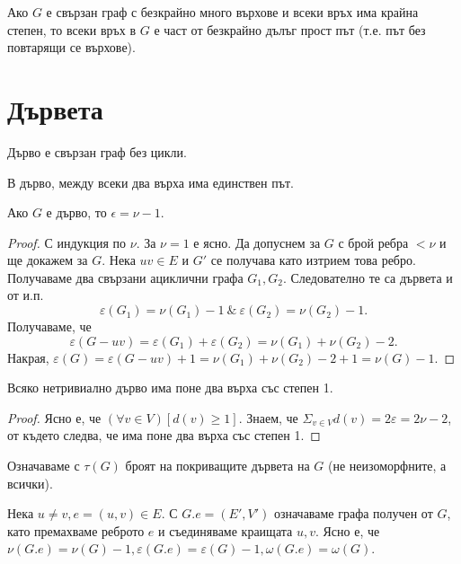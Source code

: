 \begin{lemma}
  Ако $G$ е свързан граф с безкрайно много върхове и всеки връх има крайна степен, то всеки връх в $G$ е част от 
  безкрайно дълъг прост път (т.е. път без повтарящи се върхове).
\end{lemma}


\section{Дървета}
\label{sect:tree}

\begin{dfn}
  Дърво е свързан граф без цикли.
\end{dfn}

\begin{thm}
  В дърво, между всеки два върха има единствен път.
\end{thm}

\begin{thm}
  Ако $G$ е дърво, то $\epsilon = \nu - 1$.
\end{thm}
\begin{proof}
  С индукция по $\nu$. За $\nu = 1$ е ясно.
  Да допуснем за $G$ с брой ребра $<\nu$ и ще докажем за $G$.
  Нека $uv\in E$ и $G'$ се получава като изтрием това ребро.
  Получаваме два свързани ациклични графа $G_1, G_2$.
  Следователно те са дървета и от и.п. 
  \[\varepsilon(G_1) = \nu(G_1) - 1\ \&\ \varepsilon(G_2) = \nu(G_2) - 1.\]
  Получаваме, че 
  \[\varepsilon(G - uv) = \varepsilon(G_1) + \varepsilon(G_2) = \nu(G_1) + \nu(G_2) - 2.\]
  Накрая, $\varepsilon(G) = \varepsilon(G-uv) + 1 = \nu(G_1) + \nu(G_2) - 2 + 1= \nu(G) - 1$.
\end{proof}

\begin{corollary}
  Всяко нетривиално дърво има поне два върха със степен 1.
\end{corollary}
\begin{proof}
  Ясно е, че $(\forall v\in V)[d(v) \geq 1]$.
  Знаем, че $\Sigma_{v\in V}d(v) = 2\varepsilon = 2\nu - 2$, от където следва, че има поне два върха със степен 1.
\end{proof}



Означаваме с $\tau(G)$ броят на покриващите дървета на $G$ (не неизоморфните, а всички).

Нека $u\neq v, e = (u,v)\in E$. С $G.e = (E',V')$ означаваме графа получен от $G$, като премахваме реброто $e$ и 
съединяваме краищата $u,v$. Ясно е, че $\nu(G.e) = \nu(G) - 1, \varepsilon(G.e) = \varepsilon(G) - 1, \omega(G.e) = \omega(G)$.

